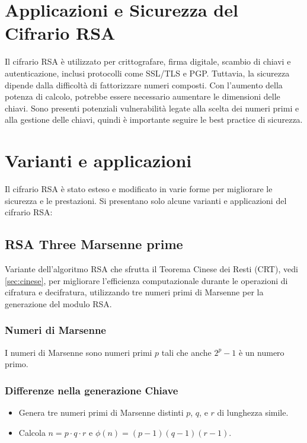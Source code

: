 \documentclass[a4paper,12pt]{report}
\begin{document}
\section{Applicazioni e Sicurezza del Cifrario RSA}

Il cifrario RSA è utilizzato per crittografare, firma digitale, scambio di chiavi e autenticazione, inclusi protocolli come SSL/TLS e PGP. Tuttavia, la sicurezza dipende dalla difficoltà di fattorizzare numeri composti. Con l'aumento della potenza di calcolo, potrebbe essere necessario aumentare le dimensioni delle chiavi. Sono presenti potenziali vulnerabilità legate alla scelta dei numeri primi e alla gestione delle chiavi, quindi è importante seguire le best practice di sicurezza.

\section{Varianti e applicazioni}
Il cifrario RSA è stato esteso e modificato in varie forme per migliorare le sicurezza e le prestazioni. Si presentano solo alcune varianti e applicazioni del cifrario RSA:

\subsection{RSA Three Marsenne prime} \cite{padmaja2016}
Variante dell'algoritmo RSA che sfrutta il Teorema Cinese dei Resti (CRT), vedi \ref{sec:cinese}, per migliorare l'efficienza computazionale durante le operazioni di cifratura e decifratura, utilizzando tre numeri primi di Marsenne per la generazione del modulo RSA.

\subsubsection*{Numeri di Marsenne}
I numeri di Marsenne sono numeri primi \(p\) tali che anche \(2^p - 1\) è un numero primo. 

\subsubsection*{Differenze nella generazione Chiave}
\begin{itemize}
    \item Genera tre numeri primi di Marsenne distinti $p$, $q$, e $r$ di lunghezza simile.
    \item Calcola $n = p \cdot q \cdot r$ e $\phi(n) = (p-1)(q-1)(r-1)$.
\end{itemize}
\end{document}
